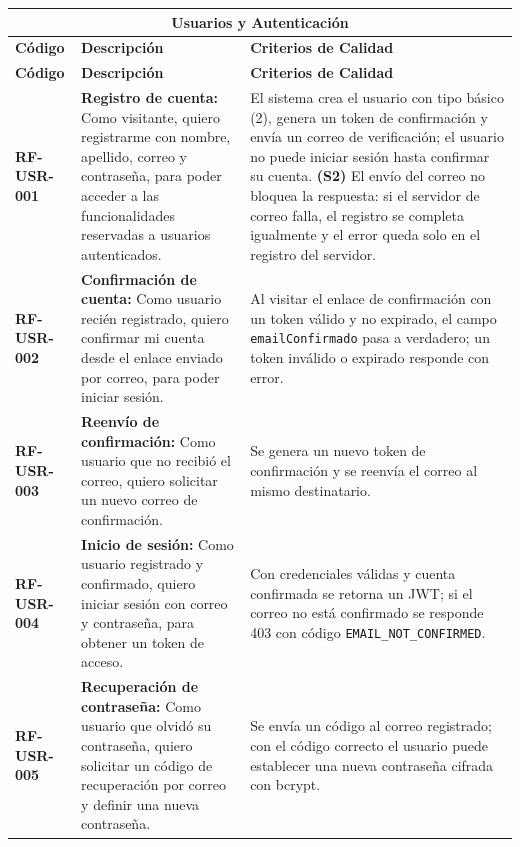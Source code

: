 \begin{longtable}{|l||p{7cm}|p{4.5cm}|}

\multicolumn{3}{c}{Usuarios y Autenticación}\\
\hline\hline
\textbf{Código} & \textbf{Descripción} & \textbf{Criterios de Calidad}\\
\hline
\endfirsthead
\textbf{Código} & \textbf{Descripción} & \textbf{Criterios de Calidad}\\
\hline\hline
\endhead

\textbf{RF-USR-001} & \textbf{Registro de cuenta:} Como visitante, quiero registrarme con nombre, apellido, correo y contraseña, para poder acceder a las funcionalidades reservadas a usuarios autenticados. & El sistema crea el usuario con tipo básico (2), genera un token de confirmación y envía un correo de verificación; el usuario no puede iniciar sesión hasta confirmar su cuenta. \textbf{(S2)} El envío del correo no bloquea la respuesta: si el servidor de correo falla, el registro se completa igualmente y el error queda solo en el registro del servidor. \\
\hline
\textbf{RF-USR-002} & \textbf{Confirmación de cuenta:} Como usuario recién registrado, quiero confirmar mi cuenta desde el enlace enviado por correo, para poder iniciar sesión. & Al visitar el enlace de confirmación con un token válido y no expirado, el campo \texttt{emailConfirmado} pasa a verdadero; un token inválido o expirado responde con error. \\
\hline
\textbf{RF-USR-003} & \textbf{Reenvío de confirmación:} Como usuario que no recibió el correo, quiero solicitar un nuevo correo de confirmación. & Se genera un nuevo token de confirmación y se reenvía el correo al mismo destinatario. \\
\hline
\textbf{RF-USR-004} & \textbf{Inicio de sesión:} Como usuario registrado y confirmado, quiero iniciar sesión con correo y contraseña, para obtener un token de acceso. & Con credenciales válidas y cuenta confirmada se retorna un JWT; si el correo no está confirmado se responde 403 con código \texttt{EMAIL\_NOT\_CONFIRMED}. \\
\hline
\textbf{RF-USR-005} & \textbf{Recuperación de contraseña:} Como usuario que olvidó su contraseña, quiero solicitar un código de recuperación por correo y definir una nueva contraseña. & Se envía un código al correo registrado; con el código correcto el usuario puede establecer una nueva contraseña cifrada con bcrypt. \\

\end{longtable}
